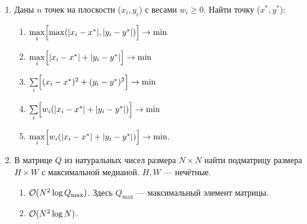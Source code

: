 \begin{enumerate}
  \item
    Даны $n$ точек на плоскости ($x_i, y_i$) с весами $w_i \ge 0$. Найти точку ($x^{*}, y^{*}$):
    \begin{enumerate}
      \item {} $\max\limits_i \Bigl[ \max(|x_i-x^{*}|, |y_i-y^{*}|) \Bigr] \rightarrow \min$
      \item {} $\max\limits_i \Bigl[ |x_i-x^{*}|+|y_i-y^{*}|  \Bigr] \rightarrow \min$
      \item {} $\sum\limits_i \Bigl[ (x_i-x^{*})^2+(y_i-y^{*})^2  \Bigr] \rightarrow \min$
      \item $\sum\limits_i \Bigl[ w_i(|x_i-x^{*}|+|y_i-y^{*}|) \Bigr] \rightarrow \min$
      \item $\max\limits_i \Bigl[ w_i(|x_i-x^{*}|+|y_i-y^{*}|) \Bigr] \rightarrow \min$.
    \end{enumerate}

  \item
    В матрице $Q$ из натуральных чисел размера $N \times N$ найти подматрицу размера $H \times W$
    с максимальной медианой. $H, W$ --- нечётные.
    \begin{enumerate}
      \item $\mathcal{O}(N^2 \log{Q_{\max}})$. Здесь $Q_{\max}$ --- максимальный элемент матрицы.
      \item $\mathcal{O}(N^2 \log{N})$.
    \end{enumerate}

    
    

\end{enumerate}